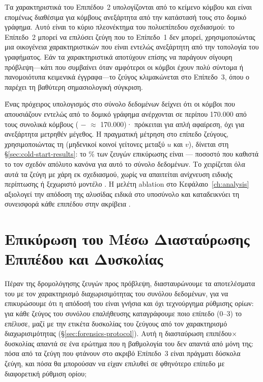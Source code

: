 Τα χαρακτηριστικά  του Επιπέδου~2 υπολογίζονται από το κείμενο κόμβου και
είναι επομένως διαθέσιμα για κόμβους  ανεξάρτητα από την
κατάστασή τους στο δομικό γράφημα.
Αυτό είναι το κύριο πλεονέκτημα του πολυεπίπεδου
σχεδιασμού: το Επίπεδο~2 μπορεί να επιλύσει ζεύγη  που το
Επίπεδο~1 δεν μπορεί, χρησιμοποιώντας μια οικογένεια χαρακτηριστικών που είναι
εντελώς ανεξάρτητη από την τοπολογία του γραφήματος.
Εάν τα χαρακτηριστικά 
αποτύχουν επίσης να παράγουν σίγουρη πρόβλεψη---κάτι που συμβαίνει όταν αμφότεροι
οι κόμβοι έχουν πολύ σύντομα ή πανομοιότυπα κειμενικά έγγραφα---το ζεύγος κλιμακώνεται
στο Επίπεδο~3, όπου ο  παρέχει τη βαθύτερη σημασιολογική
σύγκριση.

Ένας πρόχειρος υπολογισμός στο σύνολο δεδομένων  δείχνει ότι οι κόμβοι
που απουσιάζουν εντελώς από το δομικό γράφημα ανέρχονται σε περίπου 170.000 από τους
συνολικά \GraphNodesTotal{} κόμβους (\GraphNodesTotal{} $-$ \GraphNodes{} $\approx$ 170.000)· πρόκειται για απλή
αφαίρεση, όχι για ανεξάρτητα μετρηθέν μέγεθος.
Η πραγματική μέτρηση στο επίπεδο
ζεύγους, χρησιμοποιώντας τη \texttt{} (μηδενικοί κοινοί
γείτονες μεταξύ $u$ και $v$), δίνεται στη \S\ref{sec:cold-start-results}: το
\ColdStartPct\% των ζευγών επικύρωσης είναι  --- ποσοστό που καθιστά το
 τον σχεδόν απόλυτο κανόνα για αυτό το σύνολο δεδομένων.
Το
 χειρίζεται όλα αυτά τα ζεύγη με χάρη εκ σχεδιασμού, χωρίς να
απαιτείται ανίχνευση ειδικής περίπτωσης ή ξεχωριστό μοντέλο .
Η μελέτη ablation στο Κεφάλαιο~\ref{ch:analysis} αξιολογεί την απόδοση
της αλυσίδας ειδικά στο υποσύνολο  και καταδεικνύει τη
συνεισφορά κάθε επιπέδου στην ακρίβεια .


\section{Επικύρωση του  Μέσω Διασταύρωσης Επιπέδου και Δυσκολίας}
\label{sec:cascade-diagnostic}

Πέραν της δρομολόγησης ζευγών προς πρόβλεψη, διασταυρώνουμε τα αποτελέσματα του
 με τον χαρακτηρισμό διαχωρισιμότητας του συνόλου δεδομένων, για να
επικυρώσουμε ότι η απόδοσή του είναι γνήσια και όχι τεχνούργημα ρύθμισης ορίων: για κάθε
ζεύγος του συνόλου επαλήθευσης καταγράφουμε ποιο επίπεδο (0--3) το επέλυσε, μαζί
με την ετικέτα δυσκολίας του ζεύγους από τον χαρακτηρισμό διαχωρισιμότητας
(\S\ref{sec:forensics-protocol}). Αυτή η διασταύρωση επιπέδου$\times$δυσκολίας
απαντά σε ένα ερώτημα που η βαθμολογία  του  δεν
απαντά από μόνη της: πόσα από τα ζεύγη που φτάνουν στο ακριβό Επίπεδο~3 είναι
πράγματι δύσκολα ζεύγη, και πόσα θα μπορούσαν να είχαν επιλυθεί σε φθηνότερο
επίπεδο με διαφορετική ρύθμιση ορίου;

